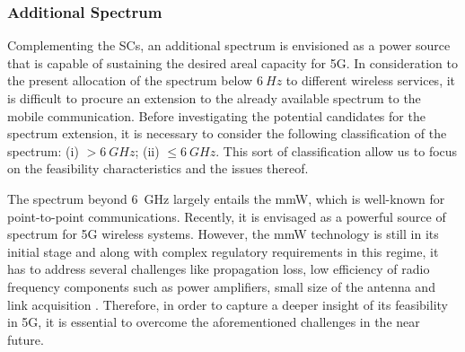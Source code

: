 \subsubsection*{Additional Spectrum}
Complementing the SCs, an additional spectrum %
is envisioned as a power source that is capable of sustaining the desired areal capacity for 5G. In consideration to the present allocation of the spectrum below $\SI{6}{Hz}$ to different wireless services, it is difficult to procure an extension to the already available spectrum to the mobile communication. Before investigating the potential candidates for the spectrum extension, it is necessary to consider the following classification of the spectrum:
(i) $> \SI{6}{GHz}$;
(ii) $\le \SI{6}{GHz}$.
This sort of classification allow us to focus on the feasibility characteristics and the issues thereof.


The spectrum beyond \SI{6}{GHz} largely entails the mmW, which is well-known for point-to-point communications. Recently, it is envisaged as a powerful source of spectrum for 5G wireless systems. However, the mmW technology is still in its initial stage and along with complex regulatory requirements in this regime, it has to address several challenges like propagation loss, low efficiency of radio frequency components such as power amplifiers, small size of the antenna and link acquisition \cite{Rapp13}. Therefore, in order to capture a deeper insight of its feasibility in 5G, it is essential to overcome the aforementioned challenges in the near future.%


